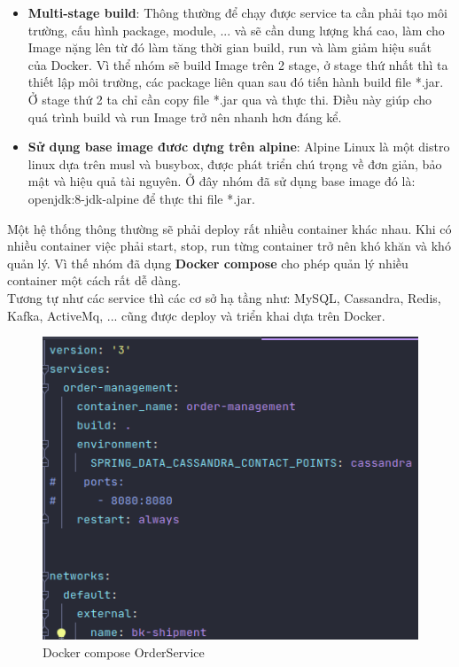 		  \begin{itemize}
		  	\item \textbf{Multi-stage build}: Thông thường để chạy được service ta cần phải tạo môi trường, cấu hình package, module, ... và sẽ cần dung lượng khá cao, làm cho Image nặng lên từ đó làm tăng thời gian build, run và làm giảm hiệu suất của Docker. Vì thể nhóm sẽ build Image trên 2 stage, ở stage thứ nhất thì ta thiết lập môi trường, các package liên quan sau đó tiến hành build file *.jar. Ở stage thứ 2 ta chỉ cần copy file *.jar qua và thực thi. Điều này giúp cho quá trình build và run Image trở nên nhanh hơn đáng kể.
		  	\item \textbf{Sử dụng base image đươc dựng trên alpine}: Alpine Linux là một distro linux dựa trên musl và busybox, được phát triển chú trọng về đơn giản, bảo mật và hiệu quả tài nguyên. Ở đây nhóm đã sử dụng base image đó là: openjdk:8-jdk-alpine để thực thi file *.jar.
		  \end{itemize}
		  
		  
		  Một hệ thống thông thường sẽ phải deploy rất nhiều container khác nhau. Khi có nhiều container việc phải start, stop, run từng container trở nên khó khăn và khó quản lý. Vì thế nhóm đã dụng \textbf{Docker compose} cho phép quản lý nhiều container một cách rất dễ dàng.\\
		  
		  Tương tự như các service thì các cơ sở hạ tầng như: MySQL, Cassandra, Redis, Kafka, ActiveMq, ... cũng được deploy và triển khai dựa trên Docker.
		  
		  \begin{figure}
		  	\centering
		  	\includegraphics[width=0.8\linewidth]{Images/DockercomposeOrderService}
		  	\linebreak
		  	\caption{Docker compose OrderService}
		  \end{figure}
		  
